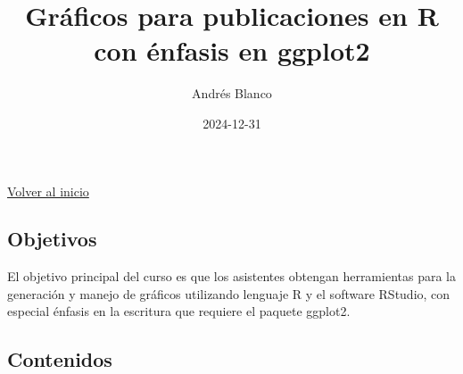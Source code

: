 \documentclass[
  letterpaper,
  DIV=11,
  numbers=noendperiod]{scrartcl}
\title{Gráficos para publicaciones en R con énfasis en ggplot2}
\author{Andrés Blanco}
\date{2024-12-31}
\renewcommand*\contentsname{Table of contents}
\newcommand\contentsname{Table of contents}
\begin{document}
\maketitle
\ifdefined\Shaded\renewenvironment{Shaded}{\begin{tcolorbox}[sharp corners, interior hidden, enhanced, boxrule=0pt, borderline west={3pt}{0pt}{shadecolor}, frame hidden, breakable]}{\end{tcolorbox}}\fi

\renewcommand*\contentsname{Contenidos}
{
\hypersetup{linkcolor=}
\setcounter{tocdepth}{3}
\tableofcontents
}
\href{../}{Volver al inicio}

\hypertarget{objetivos}{%
\subsection*{Objetivos}\label{objetivos}}

El objetivo principal del curso es que los asistentes obtengan
herramientas para la generación y manejo de gráficos utilizando lenguaje
R y el software RStudio, con especial énfasis en la escritura que
requiere el paquete ggplot2.

\hypertarget{contenidos}{%
\subsection*{Contenidos}\label{contenidos}}
\end{document}
